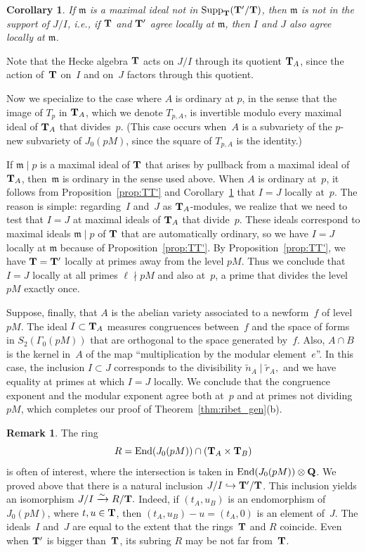 \documentclass[10pt,twoside]{article}
\newcommand{\Z}{{\bf{Z}}}
\newcommand{\Q}{{\bf{Q}}}
\newcommand{\T}{{\bf{T}}}
\newcommand{\m}{{\mathfrak{m}}}
\newcommand{\tensor}{\otimes}
\newcommand{\hra}{\hookrightarrow}
\newcommand{\End}{{\rm End}}
\newcommand{\xra}{\xrightarrow}
\newtheorem{cor}[lem]{Corollary}
\theoremstyle{definition}
\newtheorem{rmk}[lem]{Remark}
\DeclareMathOperator{\Supp}{Supp}
\begin{document}
\begin{cor}\label{cor:ji_inc}
If $\m$ is a maximal ideal not in $\Supp_{\T}(\T'/\T)$,
then $\m$ is not in the support of $J/I$, i.e., 
if $\T$ and $\T'$ agree locally at $\m$, then
$I$ and $J$ also agree locally at $\m$.
\end{cor}

Note that the Hecke algebra $\T$ acts on $J/I$ through 
its quotient $\T_A$, 
since the action of~$\T$ on~$I$ and on~$J$ factors through 
this quotient.

Now we specialize to the case where $A$ is ordinary at $p$,
in the sense that the image of $T_p$ in $\T_A$, which we
denote $T_{p,A}$, is invertible modulo every maximal ideal
of $\T_A$ that divides~$p$.  (This case occurs when~$A$ is
a subvariety of the $p$-new subvariety of $J_0(pM)$, since
the square of $T_{p,A}$ is the identity.)  


If $\m\mid p$
is a maximal ideal of $\T$ that arises by pullback from
a maximal ideal of $\T_A$, then~$\m$ is ordinary in the
sense used above.  When $A$ is ordinary at~$p$, it follows
from Proposition~\ref{prop:TT'} and Corollary~\ref{cor:ji_inc}
that $I=J$ locally at~$p$.  The reason is simple: regarding~$I$
and~$J$ as $\T_A$-modules, we realize that we need to test
that $I=J$ at maximal ideals of $\T_A$ that divide~$p$.
These ideals correspond to maximal ideals $\m\mid p$
of $\T$ that are automatically ordinary, so we have $I=J$
locally at $\m$ because of Proposition~\ref{prop:TT'}.
By Proposition~\ref{prop:TT'}, 
we have $\T=\T'$ locally at primes away from the
level $pM$.  Thus we conclude that $I=J$
locally at all primes $\ell\nmid pM$ and also at~$p$,
a prime that divides the level $pM$ exactly once.

Suppose, finally, that $A$ is the abelian variety associated to a
newform~$f$ of level~$pM$.  
The ideal $I\subset \T_A$ measures congruences between~$f$ and the space of forms
in $S_2(\Gamma_0(pM))$ that are orthogonal to the space generated
by~$f$.  Also, $A\cap B$ is the kernel in~$A$ of the map
``multiplication by the modular element~$e$''.  
In this case, the inclusion $I\subset J$ corresponds to the divisibility
$
  \tilde{n}_A \mid \tilde{r}_A,
$
and we have equality at primes at which $I=J$ locally.
We conclude that the congruence exponent and the modular exponent
agree both at~$p$ and at primes not dividing $pM$, which completes our
proof of Theorem~\ref{thm:ribet_gen}(b).

\begin{rmk}
The ring
$$
 R = \End(J_0(pM)) \cap (\T_A \times \T_B)
$$
is often of interest, where the intersection is taken
in $\End(J_0(pM))\tensor \Q$.  We proved above that there
is a natural inclusion $J/I \hra \T'/\T$.  This 
inclusion yields an isomorphism 
$
  J/I \xra{\sim} R/\T.
$
Indeed, if $(t_A, u_B)$ is an endomorphism of $J_0(pM)$,
where $t,u \in \T$, then 
$(t_A, u_B) - u  = (t_A, 0)$ is an element of~$J$.
The ideals~$I$ and~$J$ are equal to the extent that the
rings~$\T$ and $R$ coincide.  Even when $\T'$ is bigger than~$\T$,
its subring $R$ may be not far from~$\T$.
\end{rmk}
\end{document}
